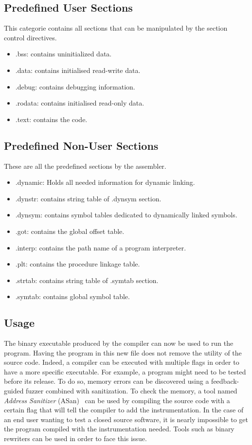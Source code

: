 \documentclass[a4paper,11pt,oneside]{report}
\begin{document}
\subsection{Predefined User Sections}
This categorie contains all sections that can be manipulated by the section
control directives.
\begin{itemize}
    \item    .bss: contains uninitialized data.
    \item    .data: contains initialised read-write data.
    \item    .debug: contains debugging information.
    \item    .rodata: contains initialised read-only data.
    \item    .text: contains the code.
\end{itemize}

\subsection{Predefined Non-User Sections}
These are all the predefined sections by the assembler.
\begin{itemize}
    \item    .dynamic: Holds all needed information for dynamic linking.
    \item    .dynstr: contains string table of .dynsym section.
    \item    .dynsym: contains symbol tables dedicated to dynamically linked
        symbols.
    \item    .got: contains the global offset table.
    \item    .interp: contains the path name of a program interpreter.
    \item    .plt: contains the procedure linkage table.
    \item    .strtab: contains string table of .symtab section.
    \item    .symtab: contains global symbol table.
\end{itemize}







\subsection{Usage}
The binary executable produced by the compiler can now be used to run the program.
Having the program in this new file does not remove the utility of the source code.
Indeed, a compiler can be executed with multiple flags in order to have a more 
specific executable. For example, a program might need to be tested before its
release.
To do so, memory errors can be discovered using a feedback-guided fuzzer
combined with sanitization.
To check the memory, a tool named \textit{Address Sanitizer} (ASan)~\cite{ASan}
can be used by compiling the source code with a certain flag that will tell the
compiler to add the instrumentation.
In the case of an end user wanting to test a closed source software, it is
nearly impossible to get the program compiled with the instrumentation needed.
Tools such as binary rewriters can be used in order to face this issue.
\end{document}
